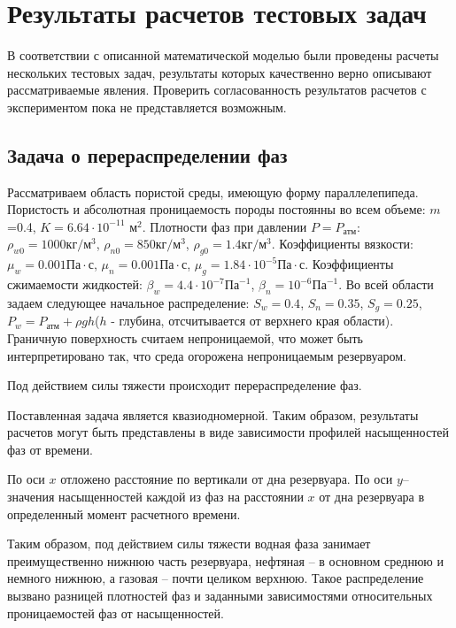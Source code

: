 %
\section{Результаты расчетов тестовых задач}
%
В соответствии с описанной математической моделью были проведены расчеты
нескольких тестовых задач, результаты которых качественно верно описывают
рассматриваемые явления. Проверить согласованность результатов расчетов с
экспериментом пока не представляется возможным.

\subsection{Задача о перераспределении фаз}
Рассматриваем область пористой среды, имеющую форму параллелепипеда. Пористость и
абсолютная проницаемость породы постоянны во всем объеме:  $m$=0.4,\; $K=6.64\cdot 10^{-11}$ м$^2$.
Плотности фаз при давлении $P=P_\text{атм}$:\; $\rho_{w0}=1000 \text{кг}/\text{м}^3$,\; 
$\rho_{n0}=850 \text{кг}/\text{м}^3$,\;
$\rho_{g0}=1.4 \text{кг}/\text{м}^3$. 
Коэффициенты вязкости:\; $\mu_w=0.001 \text{Па}\cdot \text{с}$,\;
$\mu_n=0.001 \text{Па}\cdot \text{с}$,\; $\mu_g=1.84\cdot 10^{-5} \text{Па}\cdot \text{с}$.
Коэффициенты сжимаемости жидкостей:\; $\beta_w=4.4\cdot 10^{-7} \text{Па}^{-1}$,\;
$\beta_n=10^{-6} \text{Па}^{-1}$. Во всей области задаем следующее 
начальное распределение:\; $S_w=0.4$,\; $S_n=0.35$,\; $S_g=0.25$, 
$P_w=P_\text{атм}+\rho g h$($h$ - глубина, отсчитывается от верхнего края области). 
Граничную поверхность считаем непроницаемой, что может быть интерпретировано так,
что среда огорожена непроницаемым резервуаром. 

Под действием силы тяжести происходит перераспределение фаз.

Поставленная задача является квазиодномерной. Таким образом, результаты расчетов
могут быть представлены в виде зависимости профилей насыщенностей фаз от времени.

По оси $x$ отложено расстояние по вертикали от дна резервуара. По оси $y$--
значения насыщенностей каждой из фаз на расстоянии $x$ от дна резервуара
в определенный момент расчетного времени. 

Таким образом, под действием силы тяжести водная фаза занимает
преимущественно нижнюю часть резервуара, нефтяная -- в основном среднюю
и немного нижнюю, а газовая -- почти целиком верхнюю. Такое распределение
вызвано разницей плотностей фаз и заданными зависимостями относительных
проницаемостей фаз от насыщенностей.


